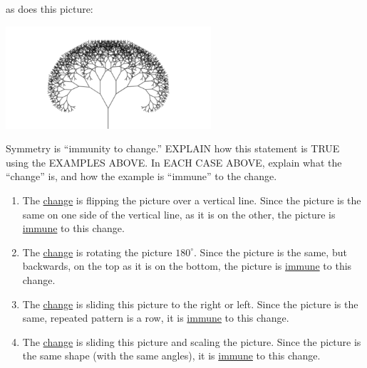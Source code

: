 \documentclass[noauthor,nooutcomes,12pt,handout]{ximera}
\begin{document}
\begin{question}
\begin{freeResponse}
\begin{enumerate}
      as does this picture:
      \begin{center}
        \includegraphics[width=3in]{fractalTree.png}
      \end{center}
    \end{enumerate}
  \end{freeResponse}
\end{question}
\mynewpage


\begin{question}
  Symmetry is ``immunity to change.'' EXPLAIN how this statement is
  TRUE using the EXAMPLES ABOVE. In EACH CASE ABOVE, explain what the
  ``change'' is, and how the example is ``immune'' to the change.
  \begin{freeResponse}
    \begin{enumerate}
      \item The \underline{change} is flipping the picture over a
        vertical line. Since the picture is the same on one side of
        the vertical line, as it is on the other, the picture is
        \underline{immune} to this change.
      \item The \underline{change} is rotating the picture
        $180^\circ$. Since the picture is the same, but backwards, on
        the top as it is on the bottom, the picture is
        \underline{immune} to this change.
      \item The \underline{change} is sliding this picture to the
        right or left. Since the picture is the same, repeated pattern
        is a row, it is \underline{immune} to this change.
      \item The \underline{change} is sliding this picture and scaling
        the picture. Since the picture is the same shape (with the
        same angles), it is \underline{immune} to this change.
    \end{enumerate}
  \end{freeResponse}
\end{question}
\mynewpage
\end{document}
